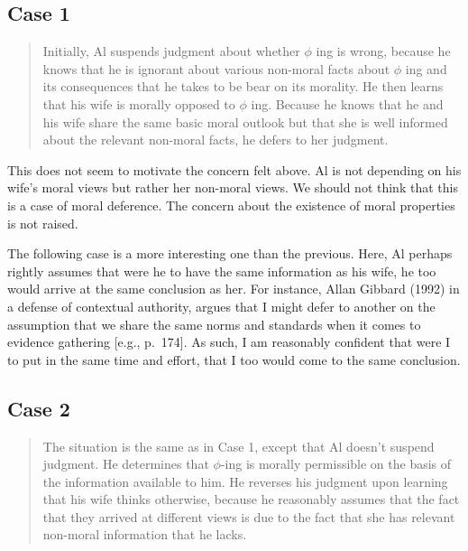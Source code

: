 \documentclass[12pt]{book}
\theoremstyle{definition}
\theoremstyle{remark}
\begin{document}
\subsection*{Case 1}\label{case-1}

\begin{quote}
Initially, Al suspends judgment about whether \(\phi\) ing is wrong, because he knows that he is ignorant about various non-moral facts about \(\phi\) ing and its consequences that he takes to be bear on its morality. He then learns that his wife is morally opposed to \(\phi\) ing. Because he knows that he and his wife share the same basic moral outlook but that she is well informed about the relevant non-moral facts, he defers to her judgment.
\end{quote}

This does not seem to motivate the concern felt above. Al is not depending on his wife's moral views but rather her non-moral views. We should not think that this is a case of moral deference. The concern about the existence of moral properties is not raised.

The following case is a more interesting one than the previous. Here, Al perhaps rightly assumes that were he to have the same information as his wife, he too would arrive at the same conclusion as her. For instance, Allan Gibbard (1992) in a defense of contextual authority, argues that I might defer to another on the assumption that we share the same norms and standards when it comes to evidence gathering {[}e.g., p.~174{]}. As such, I am reasonably confident that were I to put in the same time and effort, that I too would come to the same conclusion.

\subsection*{Case 2}\label{case-2}

\begin{quote}
The situation is the same as in Case 1, except that Al doesn't suspend judgment. He determines that \(\phi\)-ing is morally permissible on the basis of the information available to him. He reverses his judgment upon learning that his wife thinks otherwise, because he reasonably assumes that the fact that they arrived at different views is due to the fact that she has relevant non-moral information that he lacks.
\end{quote}
\end{document}

